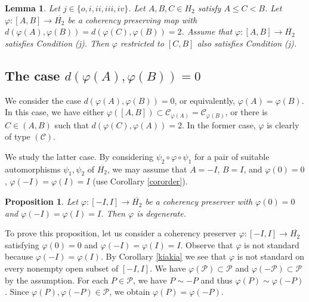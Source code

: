 \documentclass[10pt]{amsart}
\newtheorem{lemma}[theorem]{Lemma}
\newtheorem{proposition}[theorem]{Proposition}
\theoremstyle{definition}
\theoremstyle{remark}
\numberwithin{subsection}{section}
\numberwithin{equation}{section}
\newcommand\cP{{\mathcal{P}}}
\newcommand\oH{{\overline{H_2}}}
\begin{document}
\begin{lemma}\label{ABC2}
Let $j\in \{o, i, ii, iii, iv\}$.
Let $A, B, C\in H_2$ satisfy $A\le C < B$. 
Let $\varphi\colon [A, B]\to \oH$ be a coherency preserving map with $d(\varphi(A), \varphi(B))=d(\varphi(C), \varphi(B))=2$.
Assume that $\varphi\colon [A, B]\to \oH$ satisfies Condition (j). 
Then $\varphi$ restricted to $[C, B]$ also satisfies Condition (j). 
\end{lemma}





\subsection{The case $d(\varphi(A), \varphi(B))=0$}\label{dab0}
We consider the case $d(\varphi(A), \varphi(B))=0$, or equivalently, $\varphi(A)=\varphi(B)$. 
In this case, we have either $\varphi([A, B])\subset \mathcal{C}_{\varphi(A)}=\mathcal{C}_{\varphi(B)}$, or there is $C\in (A, B)$ such that $d(\varphi(C), \varphi(A))=2$. 
In the former case, $\varphi$ is clearly of type $(\mathcal{C})$. 

We study the latter case.
By considering $\psi_2\circ\varphi\circ \psi_1$ for a pair of suitable automorphisms $\psi_1, \psi_2$ of $\oH$, we may assume that $A=-I$, $B=I$, and $\varphi(0)=0$, $\varphi(-I)=\varphi(I)=I$ (use Corollary \ref{cororder}).


\begin{proposition}\label{00II}
Let $\varphi\colon [-I, I]\to \oH$ be a coherency preserver with $\varphi(0)=0$ and $\varphi(-I)=\varphi(I)=I$. 
Then $\varphi$ is degenerate.
\end{proposition}

To prove this proposition, let us consider a coherency preserver $\varphi\colon [-I, I]\to \oH$ satisfying $\varphi(0)=0$ and $\varphi(-I)=\varphi(I)=I$. 
Observe that $\varphi$ is not standard because $\varphi(-I)=\varphi(I)$. 
By Corollary \ref{kiakia}  we see that $\varphi$ is not standard on every nonempty open subset of $[-I, I]$.
We have $\varphi(\cP)\subset\cP$ and $\varphi(-\cP)\subset \cP$ by the assumption. 
For each $P\in \cP$, we have $P\sim -P$ and thus $\varphi(P)\sim \varphi(-P)$. 
Since $\varphi(P),\varphi(-P)\in \cP$, we obtain $\varphi(P)=\varphi(-P)$.
\end{document}
